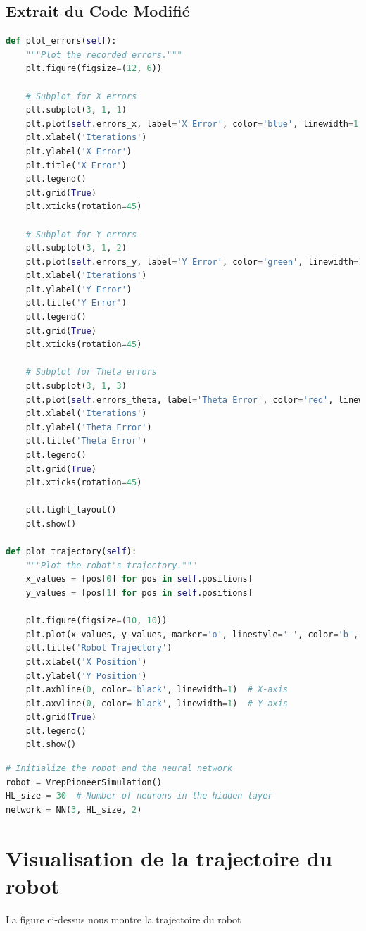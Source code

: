 \documentclass{article}
\begin{document}
\subsection*{Extrait du Code Modifié}
\begin{lstlisting}[language=Python, caption=Extract of plot functions in online\_trainer.py, label=listing:plotFunc]
def plot_errors(self):
    """Plot the recorded errors."""
    plt.figure(figsize=(12, 6))

    # Subplot for X errors
    plt.subplot(3, 1, 1)
    plt.plot(self.errors_x, label='X Error', color='blue', linewidth=1.5)
    plt.xlabel('Iterations')
    plt.ylabel('X Error')
    plt.title('X Error')
    plt.legend()
    plt.grid(True)
    plt.xticks(rotation=45)

    # Subplot for Y errors
    plt.subplot(3, 1, 2)
    plt.plot(self.errors_y, label='Y Error', color='green', linewidth=1.5)
    plt.xlabel('Iterations')
    plt.ylabel('Y Error')
    plt.title('Y Error')
    plt.legend()
    plt.grid(True)
    plt.xticks(rotation=45)

    # Subplot for Theta errors
    plt.subplot(3, 1, 3)
    plt.plot(self.errors_theta, label='Theta Error', color='red', linewidth=1.5)
    plt.xlabel('Iterations')
    plt.ylabel('Theta Error')
    plt.title('Theta Error')
    plt.legend()
    plt.grid(True)
    plt.xticks(rotation=45)

    plt.tight_layout()
    plt.show()

def plot_trajectory(self):
    """Plot the robot's trajectory."""
    x_values = [pos[0] for pos in self.positions]
    y_values = [pos[1] for pos in self.positions]

    plt.figure(figsize=(10, 10))
    plt.plot(x_values, y_values, marker='o', linestyle='-', color='b', label='Trajectory')
    plt.title('Robot Trajectory')
    plt.xlabel('X Position')
    plt.ylabel('Y Position')
    plt.axhline(0, color='black', linewidth=1)  # X-axis
    plt.axvline(0, color='black', linewidth=1)  # Y-axis
    plt.grid(True)
    plt.legend()
    plt.show()
\end{lstlisting}
\begin{lstlisting}[language=Python, caption=Extract of variables in run.py, label=listing:variables]
# Initialize the robot and the neural network
robot = VrepPioneerSimulation()
HL_size = 30  # Number of neurons in the hidden layer
network = NN(3, HL_size, 2)
\end{lstlisting}

\section{Visualisation de la trajectoire du robot}
La figure ci-dessus nous montre la trajectoire du robot 
\end{document}
